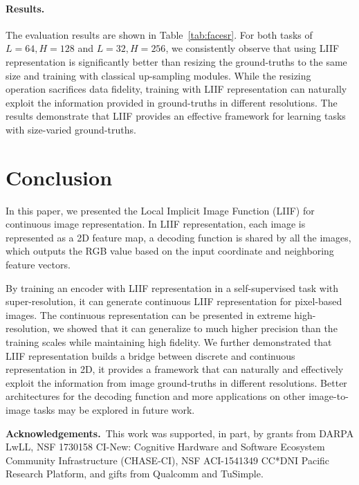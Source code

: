 \documentclass[final]{cvpr}
\begin{document}
\vspace{-1em}
\paragraph{Results.} The evaluation results are shown in Table~\ref{tab:facesr}. For both tasks of $L=64,H=128$ and $L=32,H=256$, we consistently observe that using LIIF representation is significantly better than resizing the ground-truths to the same size and training with classical up-sampling modules. While the resizing operation sacrifices data fidelity, training with LIIF representation can naturally exploit the information provided in ground-truths in different resolutions. The results demonstrate that LIIF provides an effective framework for learning tasks with size-varied ground-truths.

\section{Conclusion}

In this paper, we presented the Local Implicit Image Function (LIIF) for continuous image representation. In LIIF representation, each image is represented as a 2D feature map, a decoding function is shared by all the images, which outputs the RGB value based on the input coordinate and neighboring feature vectors.

By training an encoder with LIIF representation in a self-supervised task with super-resolution, it can generate continuous LIIF representation for pixel-based images. The continuous representation can be presented in extreme high-resolution, we showed that it can generalize to much higher precision than the training scales while maintaining high fidelity. We further demonstrated that LIIF representation builds a bridge between discrete and continuous representation in 2D, it provides a framework that can naturally and effectively exploit the information from image ground-truths in different resolutions. Better architectures for the decoding function and more applications on other image-to-image tasks may be explored in future work.

\vspace{1em}
{\footnotesize \textbf{Acknowledgements.}~This work was supported, in part, by grants from DARPA LwLL, NSF 1730158 CI-New: Cognitive Hardware and Software Ecosystem Community Infrastructure (CHASE-CI), NSF ACI-1541349 CC*DNI Pacific Research Platform, and gifts from Qualcomm and TuSimple.}

{\small


}
\end{document}
